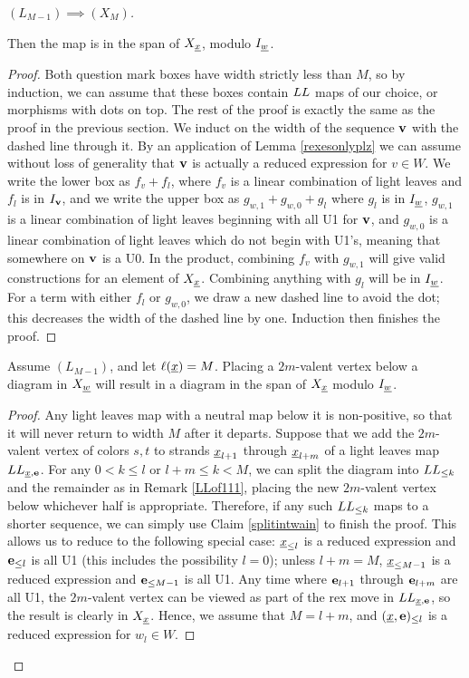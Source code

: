 \begin{proof}[$(L_{M-1}) \implies (X_M)$]
\begin{claim}

Then the map is in the span of $X_{\underline{x}}$, modulo $I_{\underline{w}}$. \end{claim}

\begin{proof} Both question mark boxes have width strictly less than $M$, so by induction, we can assume that these boxes contain $LL$ maps of our choice, or morphisms with dots on top.
The rest of the proof is exactly the same as the proof in the previous section. We induct on the width of the sequence ${\mathbf v}$ with the dashed line through it. By an application of Lemma
\ref{rexesonlyplz} we can assume without loss of generality that ${\mathbf v}$ is actually a reduced expression for $v \in W$. We write the lower box as $f_v + f_l$, where $f_v$ is a linear
combination of light leaves and $f_l$ is in $I_{\mathbf v}$, and we write the upper box as $g_{w,1} + g_{w,0} + g_l$ where $g_l$ is in $I_{\underline{w}}$, $g_{w,1}$ is a linear combination of light leaves
beginning with all U1 for ${\mathbf v}$, and $g_{w,0}$ is a linear combination of light leaves which do not begin with U1's, meaning that somewhere on ${\mathbf v}$ is a U0. In the product, combining
$f_v$ with $g_{w,1}$ will give valid constructions for an element of $X_{\underline{x}}$. Combining anything with $g_l$ will be in $I_{\underline{w}}$. For a term with either $f_l$ or $g_{w,0}$, we draw a new
dashed line to avoid the dot; this decreases the width of the dashed line by one. Induction then finishes the proof. \end{proof}

\begin{claim} \label{add2m} Assume $(L_{M-1})$, and let $\ell({\underline{x}})=M$. Placing a $2m$-valent vertex below a diagram in $X_{\underline{w}}$ will result in a diagram in the span of $X_{\underline{x}}$ modulo $I_{\underline{w}}$.
\end{claim}

\begin{proof} Any light leaves map with a neutral map below it is non-positive, so that it will never return to width $M$ after it departs. Suppose that we add the $2m$-valent vertex of
colors $s,t$ to strands ${\underline{x}}_{l+1}$ through ${\underline{x}}_{l+m}$ of a light leaves map $LL_{{\underline{x}},{\mathbf e}}$. For any $0< k \le l$ or $l+m \le k < M$, we can split the diagram into $LL_{\le k}$ and the
remainder as in Remark \ref{LLof111}, placing the new $2m$-valent vertex below whichever half is appropriate. Therefore, if any such $LL_{\le k}$ maps to a shorter sequence, we can simply
use Claim \ref{splitintwain} to finish the proof. This allows us to reduce to the following special case: ${\underline{x}}_{\le l}$ is a reduced expression and ${\mathbf e}_{\le l}$ is all U1 (this includes
the possibility $l=0$); unless $l+m=M$, ${\underline{x}}_{\le M-1}$ is a reduced expression and ${\mathbf e}_{\le M-1}$ is all U1. Any time where ${\mathbf e}_{l+1}$ through ${\mathbf e}_{l+m}$ are all U1, the $2m$-valent
vertex can be viewed as part of the rex move in $LL_{{\underline{x}},{\mathbf e}}$, so the result is clearly in $X_{\underline{x}}$. Hence, we assume that $M=l+m$, and $({\underline{x}},{\mathbf e})_{\le l}$ is a reduced expression for
$w_l \in W$.


\end{proof}
\end{proof}
